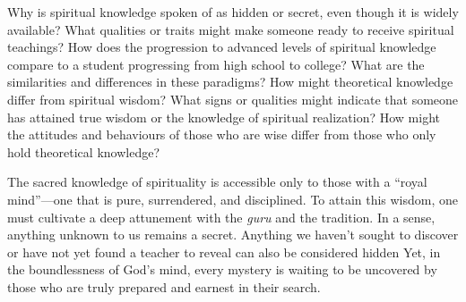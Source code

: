 \newpage
\begin{mananam}{}
\normalfont\mananamtext
Why is spiritual knowledge spoken of as hidden or secret, even though it is widely available? What qualities or traits might make someone ready to receive spiritual teachings? How does the progression to advanced levels of spiritual knowledge compare to a student progressing from high school to college? What are the similarities and differences in these paradigms? 
How might theoretical knowledge differ from spiritual wisdom? What signs or qualities might indicate that someone has attained true wisdom or the knowledge of spiritual realization? How might the attitudes and behaviours of those who are wise differ from those who only hold theoretical knowledge?
\end{mananam}
\sreflect
\begin{inspiration}{}
\normalfont\mananamtext The sacred knowledge of spirituality is accessible only to those with a ``royal mind''—one that is pure, surrendered, and disciplined. To attain this wisdom, one must cultivate a deep attunement with the \emph{guru} and the tradition.
In a sense, anything unknown to us remains a secret. Anything we haven't sought to discover or have not yet found a teacher to reveal can also be considered hidden Yet, in the boundlessness of God’s mind, every mystery is waiting to be uncovered by those who are truly prepared and earnest in their search.
\end{inspiration}
